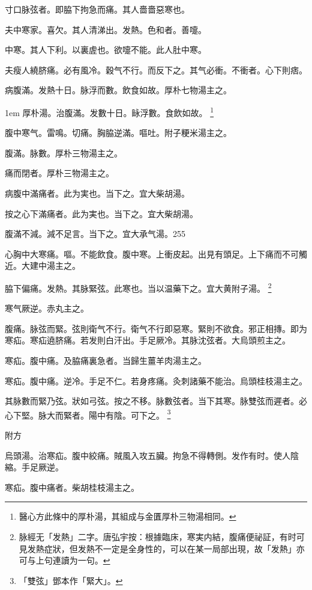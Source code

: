 寸口脉弦者。即脇下拘急而痛。其人嗇嗇惡寒也。

夫中寒家。喜欠。其人清涕出。发熱。色和者。善嚏。

中寒。其人下利。以裏虗也。欲嚏不能。此人肚中寒。

夫瘦人繞脐痛。必有風冷。穀气不行。而反下之。其气必衝。不衝者。心下則痞。

病腹滿。发熱十日。脉浮而數。飲食如故。厚朴七物湯主之。


\hangindent 1em
厚朴湯。治腹滿。发數十日。眿浮數。食飲如故。{\yixin}
	\footnote{醫心方此條中的厚朴湯，其組成与金匱厚朴三物湯相同。}

腹中寒气。雷鳴。切痛。胸脇逆滿。嘔吐。附子粳米湯主之。

腹滿。脉數。厚朴三物湯主之。{\wuben}

痛而閉者。厚朴三物湯主之。{\dengben}

病腹中滿痛者。此为実也。当下之。宜大柴胡湯。{\wuben}

按之心下滿痛者。此为実也。当下之。宜大柴胡湯。{\dengben}

腹滿不減。減不足言。当下之。宜{\khaaitp 大}承气湯。255

心胸中大寒痛。嘔。不能飲食。腹中寒。上衝皮起。出見有頭足。上下痛而不可觸近。大建中湯主之。

脇下偏痛。{\khaaitp 发熱。}其脉緊弦。此寒也。{\khaaitp 当}以温藥下之。宜大黄附子湯。
	\footnote{
		脉經无「发熱」二字。唐弘宇按：根據臨床，寒実内結，腹痛便祕証，有时可見发熱症狀，但发熱不一定是全身性的，可以在某一局部出現，故「发熱」亦可与上句連讀为一句。
	}

寒气厥逆。赤丸主之。

腹痛。脉弦而緊。弦則衛气不行。{\khaaitp 衛气不行}即惡寒。緊則不欲食。邪正相摶。即为寒疝。寒疝遶脐痛。若发則白汗出。手足厥冷。其脉沈弦者。大烏頭煎主之。

寒疝。腹中痛。及脇痛裏急者。当歸生薑羊肉湯主之。

寒疝。腹中痛。逆冷。手足不仁。若身疼痛。灸刺諸藥不能治。烏頭桂枝湯主之。

其脉數而緊乃弦。狀如弓弦。按之不移。脉數弦者。当下其寒。脉雙弦而遲者。必心下堅。脉大而緊者。陽中有陰。可下之。
	\footnote{
		「雙弦」鄧本作「緊大」。
	}

附方

烏頭湯。治寒疝。腹中絞痛。賊風入攻五臟。拘急不得轉側。发作有时。使人陰縮。手足厥逆。

寒疝。腹中痛者。柴胡桂枝湯主之。{\wuben}

